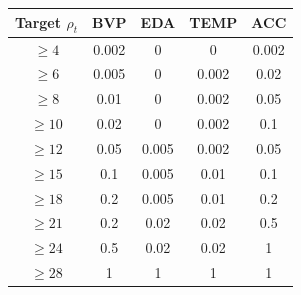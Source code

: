 \begin{tabular}{ccccc}
\toprule
Target $\rho_t$ & BVP & EDA & TEMP & ACC \\
\midrule
$\ge4$ & 0.002 & 0 & 0 & 0.002 \\
$\ge6$ & 0.005 & 0 & 0.002 & 0.02 \\
$\ge8$ & 0.01 & 0 & 0.002 & 0.05 \\
$\ge10$ & 0.02 & 0 & 0.002 & 0.1 \\
$\ge12$ & 0.05 & 0.005 & 0.002 & 0.05 \\
$\ge15$ & 0.1 & 0.005 & 0.01 & 0.1 \\
$\ge18$ & 0.2 & 0.005 & 0.01 & 0.2 \\
$\ge21$ & 0.2 & 0.02 & 0.02 & 0.5 \\
$\ge24$ & 0.5 & 0.02 & 0.02 & 1 \\
$\ge28$ & 1 & 1 & 1 & 1 \\
\bottomrule
\end{tabular}
